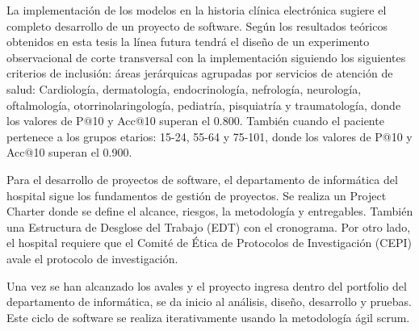 La implementación de los modelos en la historia clínica electrónica sugiere el completo desarrollo de un proyecto de software. Según los resultados teóricos obtenidos en esta tesis la línea futura tendrá el diseño de un experimento observacional de corte transversal con la implementación siguiendo los siguientes criterios de inclusión: áreas jerárquicas agrupadas por servicios de atención de salud: Cardiología, dermatología, endocrinología, nefrología, neurología, oftalmología, otorrinolaringología, pediatría, pisquiatría y traumatología, donde los valores de P@10 y Acc@10 superan el 0.800. También cuando el paciente pertenece a los grupos etarios: 15-24, 55-64 y 75-101, donde los valores de P@10 y Acc@10 superan el 0.900.

Para el desarrollo de proyectos de software, el departamento de informática del hospital sigue los fundamentos de gestión de proyectos. Se realiza un Project Charter donde se define el alcance, riesgos, la metodología y entregables. También una Estructura de Desglose del Trabajo (EDT) con el cronograma. Por otro lado, el hospital requiere que el Comité de Ética de Protocolos de Investigación (CEPI) avale el protocolo de investigación. 

Una vez se han alcanzado los avales y el proyecto ingresa dentro del portfolio del departamento de informática, se da inicio al análisis, diseño, desarrollo y pruebas. Este ciclo de software se realiza iterativamente usando la metodología ágil scrum. 
